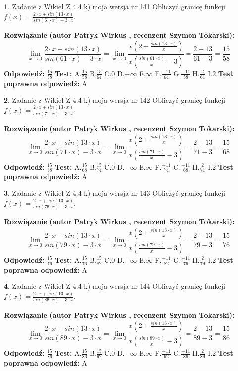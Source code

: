 \documentclass[12pt, a4paper]{article}
\theoremstyle{definition} %
\newtheorem{zad}{}
\newcommand{\zadStart}[1]{\begin{zad}#1\newline}
\newcommand{\zadStop}{\end{zad}}
\newcommand{\rozwStart}[2]{\noindent \textbf{Rozwiązanie (autor #1 , recenzent #2): }\newline}
\newcommand{\rozwStop}{\newline}
\newcommand{\odpStart}{\noindent \textbf{Odpowiedź:}\newline}
\newcommand{\odpStop}{\newline}
\newcommand{\testStart}{\noindent \textbf{Test:}\newline}
\newcommand{\testStop}{\newline}
\newcommand{\kluczStart}{\noindent \textbf{Test poprawna odpowiedź:}\newline}
\newcommand{\kluczStop}{\newline}
\begin{document}
\zadStart{Zadanie z Wikieł Z 4.4 k) moja wersja nr 141}
Obliczyć granicę funkcji $f(x)=\frac{2\cdot x +sin(13\cdot x)}{sin(61\cdot x) -3\cdot x}$.
\zadStop
\rozwStart{Patryk Wirkus}{Szymon Tokarski}
$$\lim\limits_{x\to 0}\frac{2\cdot x +sin(13\cdot x)}{sin(61\cdot x) -3\cdot x}
=\lim\limits_{x\to 0}\frac{x(2+\frac{sin(13\cdot x)}{x})}{x(\frac{sin(61\cdot x)}{x}-3)}
=\frac{2+13}{61-3} = \frac{15}{58}$$
\rozwStop
\odpStart
$\frac{15}{58}$
\odpStop
\testStart
A.$\frac{15}{58}$
B.$\frac{15}{64}$
C.$0$
D.$-\infty$
E.$\infty$
F.$\frac{-11}{64}$
G.$\frac{-11}{58}$
H.$\frac{2}{61}$
I.$2$
\testStop
\kluczStart
A
\kluczStop



\zadStart{Zadanie z Wikieł Z 4.4 k) moja wersja nr 142}
Obliczyć granicę funkcji $f(x)=\frac{2\cdot x +sin(13\cdot x)}{sin(71\cdot x) -3\cdot x}$.
\zadStop
\rozwStart{Patryk Wirkus}{Szymon Tokarski}
$$\lim\limits_{x\to 0}\frac{2\cdot x +sin(13\cdot x)}{sin(71\cdot x) -3\cdot x}
=\lim\limits_{x\to 0}\frac{x(2+\frac{sin(13\cdot x)}{x})}{x(\frac{sin(71\cdot x)}{x}-3)}
=\frac{2+13}{71-3} = \frac{15}{68}$$
\rozwStop
\odpStart
$\frac{15}{68}$
\odpStop
\testStart
A.$\frac{15}{68}$
B.$\frac{15}{74}$
C.$0$
D.$-\infty$
E.$\infty$
F.$\frac{-11}{74}$
G.$\frac{-11}{68}$
H.$\frac{2}{71}$
I.$2$
\testStop
\kluczStart
A
\kluczStop



\zadStart{Zadanie z Wikieł Z 4.4 k) moja wersja nr 143}
Obliczyć granicę funkcji $f(x)=\frac{2\cdot x +sin(13\cdot x)}{sin(79\cdot x) -3\cdot x}$.
\zadStop
\rozwStart{Patryk Wirkus}{Szymon Tokarski}
$$\lim\limits_{x\to 0}\frac{2\cdot x +sin(13\cdot x)}{sin(79\cdot x) -3\cdot x}
=\lim\limits_{x\to 0}\frac{x(2+\frac{sin(13\cdot x)}{x})}{x(\frac{sin(79\cdot x)}{x}-3)}
=\frac{2+13}{79-3} = \frac{15}{76}$$
\rozwStop
\odpStart
$\frac{15}{76}$
\odpStop
\testStart
A.$\frac{15}{76}$
B.$\frac{15}{82}$
C.$0$
D.$-\infty$
E.$\infty$
F.$\frac{-11}{82}$
G.$\frac{-11}{76}$
H.$\frac{2}{79}$
I.$2$
\testStop
\kluczStart
A
\kluczStop



\zadStart{Zadanie z Wikieł Z 4.4 k) moja wersja nr 144}
Obliczyć granicę funkcji $f(x)=\frac{2\cdot x +sin(13\cdot x)}{sin(89\cdot x) -3\cdot x}$.
\zadStop
\rozwStart{Patryk Wirkus}{Szymon Tokarski}
$$\lim\limits_{x\to 0}\frac{2\cdot x +sin(13\cdot x)}{sin(89\cdot x) -3\cdot x}
=\lim\limits_{x\to 0}\frac{x(2+\frac{sin(13\cdot x)}{x})}{x(\frac{sin(89\cdot x)}{x}-3)}
=\frac{2+13}{89-3} = \frac{15}{86}$$
\rozwStop
\odpStart
$\frac{15}{86}$
\odpStop
\testStart
A.$\frac{15}{86}$
B.$\frac{15}{92}$
C.$0$
D.$-\infty$
E.$\infty$
F.$\frac{-11}{92}$
G.$\frac{-11}{86}$
H.$\frac{2}{89}$
I.$2$
\testStop
\kluczStart
A
\kluczStop
\end{document}
